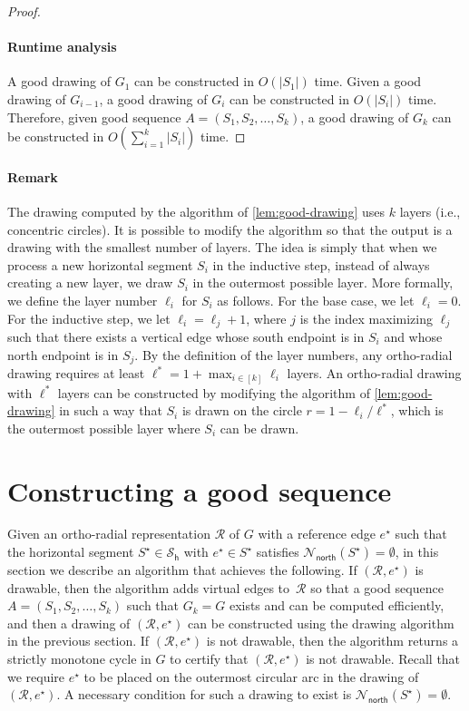 \documentclass{article}\usepackage[a4paper,margin=20mm]{geometry}
\newcommand{\RR}{\mathcal{R}}
\newcommand{\PH}{\mathcal{S}_\mathsf{h}}
\newcommand{\Nnorth}{\mathcal{N}_\mathsf{north}}
\newcommand{\eref}{e^\star}
\begin{document}
\begin{proof}
\paragraph{Runtime analysis} A good drawing of $G_1$ can be constructed in $O\left(|S_1|\right)$ time. Given a good drawing of  $G_{i-1}$, a good drawing of $G_{i}$ can be constructed in $O\left(|S_i|\right)$ time. Therefore,  given good sequence $A=(S_1, S_2, \ldots, S_{k})$, a good drawing of $G_k$ can be constructed in $O\left(\sum_{i=1}^k |S_i|\right)$ time.
\end{proof}


\paragraph{Remark} The drawing computed by the algorithm of \cref{lem:good-drawing} uses $k$ layers (i.e., concentric circles). It is possible to modify the algorithm so that the output is a drawing with the smallest number of layers. The idea is simply that when we process a new horizontal segment $S_i$ in the inductive step, instead of always creating a new layer, we draw $S_i$ in the outermost possible layer. More formally, we define the layer number $\ell_i$ for $S_i$ as follows. For the base case, we let $\ell_i = 0$. For the inductive step, we let $\ell_i = \ell_j + 1$, where $j$ is the index maximizing $\ell_j$ such that there exists a vertical edge whose south endpoint is in $S_i$ and whose north endpoint is in $S_j$. By the definition of the layer numbers,  any ortho-radial drawing requires at least $\ell^\ast = 1 + \max_{i \in [k]} \ell_i$ layers. An ortho-radial drawing with $\ell^\ast$ layers can be constructed by modifying the algorithm of \cref{lem:good-drawing} in such a way that $S_i$ is drawn on the circle $r = 1 - \ell_i/\ell^\ast$, which is the outermost possible layer where $S_i$ can be drawn.


\section{Constructing a good sequence}\label{sect:sequence}

 Given an ortho-radial representation $\RR$ of $G$ with a reference edge $\eref$ such that the horizontal segment $S^\star \in \PH$ with $\eref \in S^\star$ satisfies $\Nnorth(S^\star) = \emptyset$, in this section we describe an algorithm that achieves the following. If $(\RR,\eref)$ is drawable, then the algorithm adds virtual edges to~$\RR$  so that a good sequence $A=(S_1, S_2, \ldots, S_{k})$ such that $G_k = G$ exists and can be computed efficiently, and then a drawing of $(\RR,\eref)$ can be constructed using the drawing algorithm in the previous section. If $(\RR,\eref)$ is not drawable, then the algorithm returns a strictly monotone cycle in $G$ to certify that  $(\RR,\eref)$ is not drawable. Recall that we require  $\eref$ to be placed on the outermost circular arc in the drawing of $(\RR,\eref)$. A necessary condition for such a drawing to exist is $\Nnorth(S^\star) = \emptyset$.
 
\end{document}
